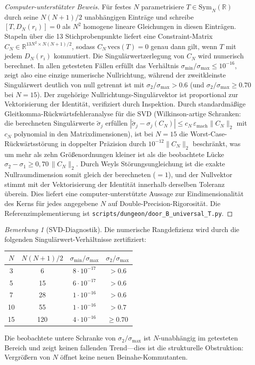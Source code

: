 ﻿\documentclass[12pt,a4paper]{article}
\theoremstyle{definition}
\theoremstyle{remark}
\newtheorem{remark}[theorem]{Bemerkung}
\begin{document}
\begin{proof}[Computer-unterstützter Beweis]
Für festes $N$ parametrisiere $T \in \mathrm{Sym}_N(\mathbb{R})$ durch seine $N(N+1)/2$ unabhängigen Einträge und schreibe $[T, D_N(r_i)] = 0$ als $N^2$ homogene lineare Gleichungen in diesen Einträgen. Stapeln über die 13 Stichprobenpunkte liefert eine Constraint-Matrix $C_N \in \mathbb{R}^{13 N^2 \times N(N+1)/2}$, sodass $C_N\,\mathrm{vecs}(T) = 0$ genau dann gilt, wenn $T$ mit jedem $D_N(r_i)$ kommutiert. Die Singulärwertzerlegung von $C_N$ wird numerisch berechnet. In allen getesteten Fällen erfüllt das Verhältnis $\sigma_{\min}/\sigma_{\max} \leq 10^{-16}$, zeigt also eine einzige numerische Nullrichtung, während der zweitkleinste Singulärwert deutlich von null getrennt ist mit $\sigma_2/\sigma_{\max} > 0.6$ (und $\sigma_2/\sigma_{\max} \geq 0.70$ bei $N = 15$). Der zugehörige Nullrichtungs-Singulärvektor ist proportional zur Vektorisierung der Identität, verifiziert durch Inspektion. Durch standardmäßige Gleitkomma-Rückwärtsfehleranalyse für die SVD (Wilkinson-artige Schranken: die berechneten Singulärwerte $\tilde\sigma_j$ erfüllen $|\tilde\sigma_j - \sigma_j(C_N)| \leq c_N\,\varepsilon_{\mathrm{mach}}\|C_N\|_2$ mit $c_N$ polynomial in den Matrixdimensionen), ist bei $N = 15$ die Worst-Case-Rückwärtsstörung in doppelter Präzision durch $10^{-12}\|C_N\|_2$ beschränkt, was um mehr als zehn Größenordnungen kleiner ist als die beobachtete Lücke $\sigma_2 - \sigma_1 \geq 0{,}70\,\|C_N\|_2$. Durch Weyls Störungsungleichung ist die exakte Nullraumdimension somit gleich der berechneten ($=1$), und der Nullvektor stimmt mit der Vektorisierung der Identität innerhalb derselben Toleranz überein. Dies liefert eine computer-unterstützte Aussage zur Eindimensionalität des Kerns für jedes angegebene $N$ auf Double-Precision-Rigorosität. Die Referenzimplementierung ist \texttt{scripts/dungeon/door\_B\_universal\_T.py}.
\end{proof}

\begin{remark}[SVD-Diagnostik]
\label{rem:NE-B-svd-de}
Die numerische Rangdefizienz wird durch die folgenden Singulärwert-Verhältnisse zertifiziert:
\begin{center}
\renewcommand{\arraystretch}{1.15}
\begin{tabular}{c|c|c|c}
\toprule
$N$ & $N(N+1)/2$ & $\sigma_{\min}/\sigma_{\max}$ & $\sigma_2/\sigma_{\max}$ \\
\midrule
3  & 6   & $8 \cdot 10^{-17}$ & $> 0.6$ \\
5  & 15  & $6 \cdot 10^{-17}$ & $> 0.6$ \\
7  & 28  & $1 \cdot 10^{-16}$ & $> 0.6$ \\
10 & 55  & $1 \cdot 10^{-16}$ & $> 0.7$ \\
15 & 120 & $4 \cdot 10^{-16}$ & $\geq 0.70$ \\
\bottomrule
\end{tabular}
\end{center}
Die beobachtete untere Schranke von $\sigma_2/\sigma_{\max}$ ist $N$-unabhängig im getesteten Bereich und zeigt keinen fallenden Trend---dies ist die strukturelle Obstruktion: Vergrößern von $N$ öffnet keine neuen Beinahe-Kommutanten.
\end{remark}
\end{document}
